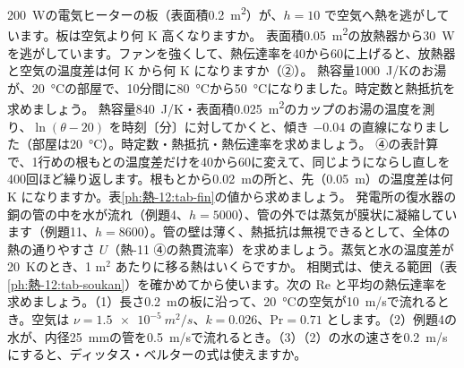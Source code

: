 \bkendproblems
{}
\bkproblem \qty{200}{W}の電気ヒーターの板（表面積\qty{0.2}{m^2}）が、$h=10$ で空気へ熱を逃がしています。板は空気より何 K 高くなりますか。
\bkproblem 表面積\qty{0.05}{m^2}の放熱器から\qty{30}{W}を逃がしています。ファンを強くして、熱伝達率を40から60に上げると、放熱器と空気の温度差は何 K から何 K になりますか（②）。
\bkproblem 熱容量\qty{1000}{J/K}のお湯が、\qty{20}{\celsius}の部屋で、10分間に\qty{80}{\celsius}から\qty{50}{\celsius}になりました。時定数と熱抵抗を求めましょう。
\bkproblem 熱容量\qty{840}{J/K}・表面積\qty{0.025}{m^2}のカップのお湯の温度を測り、$\ln(\theta-20)$ を時刻〔分〕に対してかくと、傾き $-0.04$ の直線になりました（部屋は\qty{20}{\celsius}）。時定数・熱抵抗・熱伝達率を求めましょう。
\bkproblem ④の表計算で、1行めの根もとの温度差だけを40から60に変えて、同じようにならし直しを400回ほど繰り返します。根もとから\qty{0.02}{m}の所と、先（\qty{0.05}{m}）の温度差は何 K になりますか。表\ref{ph:熱-12:tab-fin}の値から求めましょう。
\bkproblem 発電所の復水器の銅の管の中を水が流れ（例題4、$h=5000$）、管の外では蒸気が膜状に凝縮しています（例題11、$h=8600$）。管の壁は薄く、熱抵抗は無視できるとして、全体の熱の通りやすさ $U$（熱-11 ④の熱貫流率）を求めましょう。蒸気と水の温度差が\qty{20}{K}のとき、1 m$^2$ あたりに移る熱はいくらですか。
\bkproblem 相関式は、使える範囲（表\ref{ph:熱-12:tab-soukan}）を確かめてから使います。次の Re と平均の熱伝達率を求めましょう。（1）長さ\qty{0.2}{m}の板に沿って、\qty{20}{\celsius}の空気が\qty{10}{m/s}で流れるとき。空気は $\nu=\qty{1.5e-5}{m^2/s}$、$k=0.026$、$\mathrm{Pr}=0.71$ とします。（2）例題4の水が、内径\qty{25}{mm}の管を\qty{0.5}{m/s}で流れるとき。（3）（2）の水の速さを\qty{0.2}{m/s}にすると、ディッタス・ベルターの式は使えますか。
